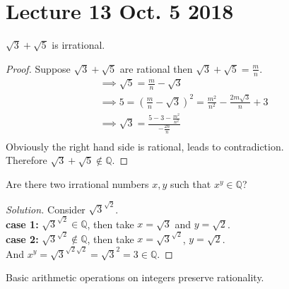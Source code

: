 \documentclass[10pt]{article}
\begin{document}
	\section{Lecture 13 Oct. 5 2018}
	\begin{example}
		$\sqrt{3} + \sqrt{5}$ is irrational.
	\end{example}
	\begin{proof}
		Suppose $\sqrt{3} + \sqrt{5}$ are rational then $\sqrt{3} + \sqrt{5} = \frac{m}{n}$. \\
		\begin{gather*}
			\implies \sqrt{5} = \frac{m}{n} - \sqrt{3} \\
			\implies 5 = (\frac{m}{n} - \sqrt{3})^2 = \frac{m^2}{n^2} - \frac{2m\sqrt{3}}{n} + 3 \\
			\implies \sqrt{3} = \frac{5-3-\frac{m^2}{n^2}}{-\frac{2n}{n}} \\
		\end{gather*}
		Obviously the right hand side is rational, leads to contradiction. \\
		Therefore $\sqrt{3} + \sqrt{5} \notin \mathbb{Q}$.
	\end{proof}
	
	\begin{example}
		Are there two irrational numbers $x,y$ such that $x^y \in \mathbb{Q}$?
	\end{example}
	\begin{proof}[Solution]
		Consider $\sqrt{3}^{\sqrt{2}}$. \\
		\textbf{case 1:} $\sqrt{3}^{\sqrt{2}} \in \mathbb{Q}$, then take $x = \sqrt{3}$ and $y = \sqrt{2}$. \\
		\textbf{case 2:} $\sqrt{3}^{\sqrt{2}} \notin \mathbb{Q}$, then take $x = \sqrt{3}^{\sqrt{2}}$, $y = \sqrt{2}$. \\
		And $x^y = \sqrt{3}^{\sqrt{2} \sqrt{2}} = \sqrt{3}^2 = 3 \in \mathbb{Q}$.
	\end{proof}
	
	\begin{remark}
		Basic arithmetic operations on integers preserve rationality.
	\end{remark}
	
\end{document}
